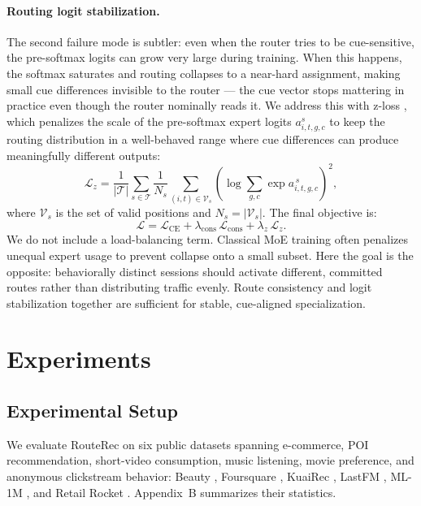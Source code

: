 \documentclass[sigconf,review,anonymous]{acmart}
\begin{document}
\paragraph{Routing logit stabilization.}
The second failure mode is subtler: even when the router tries to be cue-sensitive, the pre-softmax logits can grow very large during training. When this happens, the softmax saturates and routing collapses to a near-hard assignment, making small cue differences invisible to the router --- the cue vector stops mattering in practice even though the router nominally reads it. We address this with z-loss \cite{zoph2022stmoe}, which penalizes the scale of the pre-softmax expert logits $a_{i,t,g,c}^{s}$ to keep the routing distribution in a well-behaved range where cue differences can produce meaningfully different outputs:
\[
\mathcal{L}_{z}
=
\frac{1}{|\mathcal{T}|}
\sum_{s \in \mathcal{T}}
\frac{1}{N_s}
\sum_{(i,t)\in\mathcal{V}_s}
\!\left(\log \sum_{g,c}\exp a_{i,t,g,c}^{\,s}\right)^{\!2},
\]
where $\mathcal{V}_s$ is the set of valid positions and $N_s=|\mathcal{V}_s|$. The final objective is:
\[
\mathcal{L} = \mathcal{L}_{\mathrm{CE}} + \lambda_{\mathrm{cons}}\,\mathcal{L}_{\mathrm{cons}} + \lambda_{z}\,\mathcal{L}_{z}.
\]
We do not include a load-balancing term. Classical MoE training often penalizes unequal expert usage to prevent collapse onto a small subset. Here the goal is the opposite: behaviorally distinct sessions should activate different, committed routes rather than distributing traffic evenly. Route consistency and logit stabilization together are sufficient for stable, cue-aligned specialization.

\section{Experiments}
\label{sec:experiments}

\subsection{Experimental Setup}

We evaluate RouteRec on six public datasets spanning e-commerce, POI recommendation, short-video consumption, music listening, movie preference, and anonymous clickstream behavior: Beauty \cite{mcauley2015amazon}, Foursquare \cite{yang2015foursquare}, KuaiRec \cite{gao2022kuairec}, LastFM \cite{celma2010music}, ML-1M \cite{harper2015movielens}, and Retail Rocket \cite{retailrocket2015dataset}. Appendix~B summarizes their statistics.
\end{document}
